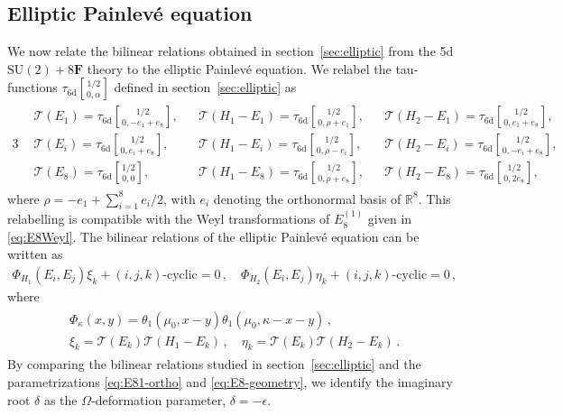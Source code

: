\documentclass[11pt, a4paper]{article}
\newcommand{\tauftnd}[2]{\tau_{\mathrm{6d}}\genfrac[]{0pt}{1}{#1}{#2}}
\theoremstyle{definition}
\begin{document}
\subsection{Elliptic Painlev\'e equation} \label{app:elliptic}

We now relate the bilinear relations obtained in section~\ref{sec:elliptic} from the 5d $ \mathrm{SU}(2)+8\mathbf{F} $ theory to the elliptic Painlev\'e equation. We relabel the tau-functions $ \tau_{\mathrm{6d}}\genfrac[]{0pt}{1}{1/2}{0,\alpha} $ defined in section~\ref{sec:elliptic} as
\begin{alignat}{3}
    \begin{aligned}
        &\mathcal{T}(E_1) = \tauftnd{1/2}{0, -e_1+e_8} ,
        &&    \mathcal{T}(H_1-E_1) = \tauftnd{1/2}{0, \rho+e_1} ,
        &&    \mathcal{T}(H_2-E_1) = \tauftnd{1/2}{0, e_1+e_8} , \\
        &    \mathcal{T}(E_i) = \tauftnd{1/2}{0, e_i+e_8} ,
        &&    \mathcal{T}(H_1-E_i) = \tauftnd{1/2}{0, \rho-e_i} ,
        &&    \mathcal{T}(H_2-E_i) = \tauftnd{1/2}{0, -e_i+e_8}  , \\
        &    \mathcal{T}(E_8) = \tauftnd{1/2}{0, 0} ,
        &&    \mathcal{T}(H_1-E_8) = \tauftnd{1/2}{0, \rho+e_8} ,
        &&    \mathcal{T}(H_2-E_8) = \tauftnd{1/2}{0, 2e_8} , 
    \end{aligned}
\end{alignat}
where $ \rho = -e_1 + \sum_{i=1}^8 e_i/2 $, with $ e_i $ denoting the orthonormal basis of $ \mathbb{R}^8 $. This relabelling is compatible with the Weyl transformations of $ E_8^{(1)} $ given in \eqref{eq:E8Weyl}. The bilinear relations of the elliptic Painlev\'e equation can be written as
\begin{align}\label{eq:elliptic-bilinear-ref}
    \Phi_{H_1}(E_i, E_j) \xi_k + (i,j,k)\text{-cyclic} = 0 \, , \quad
    \Phi_{H_2}(E_i, E_j) \eta_k + (i,j,k)\text{-cyclic} = 0 \, ,
\end{align}
where
\begin{gather}
    \begin{gathered}\label{eq:elliptic-Phi}
        \Phi_{\kappa}(x,y) = \theta_1(\mu_0, x-y) \theta_1(\mu_0, \kappa-x-y) \, , \\
        \xi_k = \mathcal{T}(E_k) \mathcal{T}(H_1-E_k) \, , \quad
        \eta_k = \mathcal{T}(E_k) \mathcal{T}(H_2-E_k) \, .
    \end{gathered}
\end{gather}
By comparing the bilinear relations studied in section~\ref{sec:elliptic} and the parametrizations \eqref{eq:E81-ortho} and \eqref{eq:E8-geometry}, we identify the imaginary root $ \delta $ as the $ \Omega $-deformation parameter, $ \delta=-\epsilon $.
\end{document}
